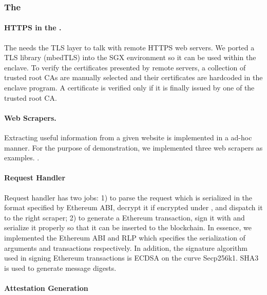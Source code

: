 \subsubsection{The \encname}

\paragraph{HTTPS in the \encname.} 
The \encname needs the TLS layer to talk with remote HTTPS web servers.  We
ported a TLS library (mbedTLS) into the SGX environment so it can be used within
the enclave.  To verify the certificates presented by remote servers, a
collection of trusted root CAs are manually selected  and their
certificates are hardcoded in the enclave program. A certificate is verified
only if it is finally issued by one of the trusted root CA.

\paragraph{Web Scrapers.} Extracting useful information from a given website is
implemented in a ad-hoc manner. For the purpose of demonstration, we implemented
three web scrapers as examples. .

\paragraph{Request Handler} Request handler has two jobs: 1) to parse the
request which is serialized in the format specified by Ethereum ABI, decrypt it if encrypted under
\pkTC, and dispatch it to the right scraper; 2) to generate a Ethereum
transaction, sign it with \pkTC and serialize it properly so that it can be
inserted to the blockchain. In essence, we implemented the Ethereum ABI and RLP which
specifies the serialization of arguments and transactions respectively.
In addition, the signature algorithm used in signing Ethereum transactions is
ECDSA on the curve Secp256k1. SHA3 is used to generate message digests.

\paragraph{Attestation Generation} 
